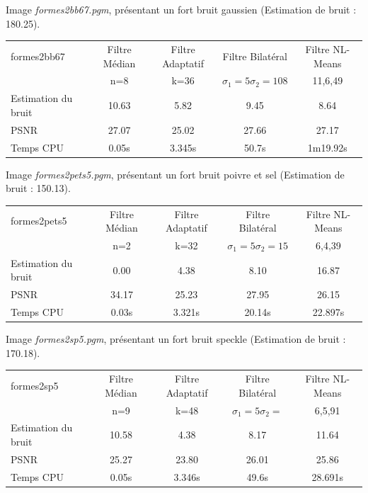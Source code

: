 \documentclass[a4,12pt]{article}
\begin{document}
\vspace{2em}

Image \textit{formes2bb67.pgm}, présentant un fort bruit gaussien (Estimation de bruit : 180.25).

\begin{center}
\begin{tabular}{|l||c|c|c|c|}
\hline
formes2bb67 & Filtre Médian & Filtre Adaptatif & Filtre Bilatéral & Filtre NL-Means\\
& n=8 & k=36 & $\sigma_1 = 5 \sigma_2 = 108$ & 11,6,49\\
\hline
Estimation du bruit
& 10.63
& 5.82
& 9.45
& 8.64\\
\hline
PSNR
& 27.07
& 25.02
& 27.66
& 27.17\\
\hline
Temps CPU
& 0.05s
& 3.345s
& 50.7s
& 1m19.92s\\
\hline
\end{tabular} 
\end{center}

\vspace{2em}

Image \textit{formes2pets5.pgm}, présentant un fort bruit poivre et sel (Estimation de bruit : 150.13).

\begin{center}
\begin{tabular}{|l||c|c|c|c|}
\hline
formes2pets5  & Filtre Médian & Filtre Adaptatif & Filtre Bilatéral & Filtre NL-Means\\
& n=2 & k=32 & $\sigma_1 = 5 \sigma_2 = 15$ & 6,4,39\\
\hline
Estimation du bruit
& 0.00
& 4.38
& 8.10
& 16.87\\
\hline
PSNR
& 34.17
& 25.23
& 27.95
& 26.15\\
\hline
Temps CPU
& 0.03s
& 3.321s
& 20.14s
& 22.897s\\
\hline
\end{tabular} 
\end{center}

\vspace{2em}

Image \textit{formes2sp5.pgm}, présentant un fort bruit speckle (Estimation de bruit : 170.18).

\begin{center}
\begin{tabular}{|l||c|c|c|c|}
\hline
formes2sp5  & Filtre Médian & Filtre Adaptatif & Filtre Bilatéral & Filtre NL-Means \\
& n=9 & k=48 & $\sigma_1 = 5 \sigma_2 = $ &6,5,91\\
\hline
Estimation du bruit
& 10.58
& 4.38
& 8.17
& 11.64\\
\hline
PSNR
& 25.27
& 23.80
& 26.01
& 25.86\\
\hline
Temps CPU
& 0.05s
& 3.346s
& 49.6s
& 28.691s\\
\hline
\end{tabular} 
\end{center}
\end{document}
